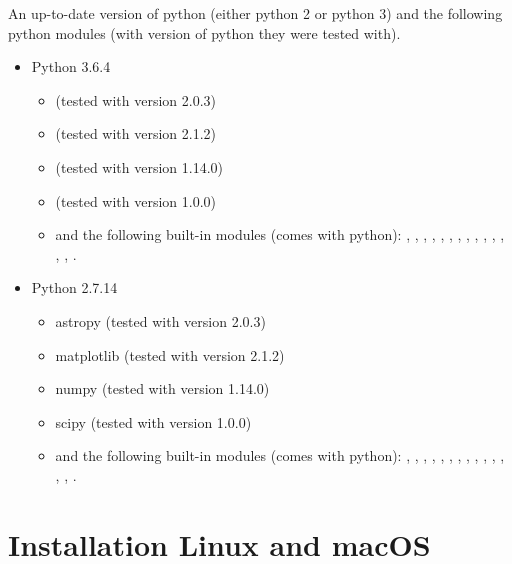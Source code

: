 An up-to-date version of python (either python 2 or python 3) and the following python modules (with version of python they were tested with).
\begin{itemize}
\item Python 3.6.4
	\begin{itemize}
	\item {} (tested with version 2.0.3)
	\item {} (tested with version 2.1.2)
	\item {} (tested with version 1.14.0)
	\item {} (tested with version 1.0.0)
	\item and the following built-in modules (comes with python): 
	, , , , , , , , , , , , , , .
	\end{itemize}
\item Python 2.7.14
	\begin{itemize}
	\item astropy (tested with version 2.0.3)
	\item matplotlib (tested with version 2.1.2)
	\item numpy (tested with version 1.14.0)
	\item scipy (tested with version 1.0.0)
	\item and the following built-in modules (comes with python): 
	, , , , , , , , , , , , , , .
	\end{itemize}
\end{itemize}






\clearpage
\newpage
\section{Installation Linux and macOS}
\label{ch:install:installunix}

